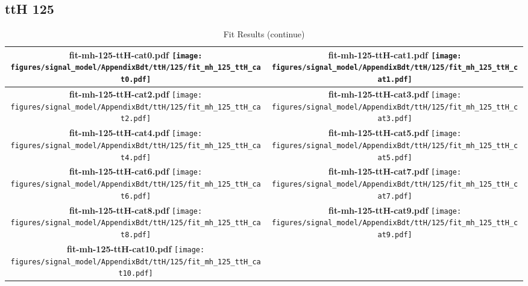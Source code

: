 \subsection{ttH 125}
\begin{longtable}{|c|c|}
\caption{Fit Results}
\endfirsthead
\caption{Fit Results (continue)}
\endhead
\hline
\parbox{0.47\textwidth}{
\centering
{\bfseries fit-mh-125-ttH-cat0.pdf}
\texttt{[image: figures/signal\_model/AppendixBdt/ttH/125/fit\_mh\_125\_ttH\_cat0.pdf]}
}
 & \parbox{0.47\textwidth}{
\centering
{\bfseries fit-mh-125-ttH-cat1.pdf}
\texttt{[image: figures/signal\_model/AppendixBdt/ttH/125/fit\_mh\_125\_ttH\_cat1.pdf]}
}
 \\
\hline
\parbox{0.47\textwidth}{
\centering
{\bfseries fit-mh-125-ttH-cat2.pdf}
\texttt{[image: figures/signal\_model/AppendixBdt/ttH/125/fit\_mh\_125\_ttH\_cat2.pdf]}
}
 & \parbox{0.47\textwidth}{
\centering
{\bfseries fit-mh-125-ttH-cat3.pdf}
\texttt{[image: figures/signal\_model/AppendixBdt/ttH/125/fit\_mh\_125\_ttH\_cat3.pdf]}
}
 \\
\hline
\parbox{0.47\textwidth}{
\centering
{\bfseries fit-mh-125-ttH-cat4.pdf}
\texttt{[image: figures/signal\_model/AppendixBdt/ttH/125/fit\_mh\_125\_ttH\_cat4.pdf]}
}
 & \parbox{0.47\textwidth}{
\centering
{\bfseries fit-mh-125-ttH-cat5.pdf}
\texttt{[image: figures/signal\_model/AppendixBdt/ttH/125/fit\_mh\_125\_ttH\_cat5.pdf]}
}
 \\
\hline
\parbox{0.47\textwidth}{
\centering
{\bfseries fit-mh-125-ttH-cat6.pdf}
\texttt{[image: figures/signal\_model/AppendixBdt/ttH/125/fit\_mh\_125\_ttH\_cat6.pdf]}
}
 & \parbox{0.47\textwidth}{
\centering
{\bfseries fit-mh-125-ttH-cat7.pdf}
\texttt{[image: figures/signal\_model/AppendixBdt/ttH/125/fit\_mh\_125\_ttH\_cat7.pdf]}
}
 \\
\hline
\parbox{0.47\textwidth}{
\centering
{\bfseries fit-mh-125-ttH-cat8.pdf}
\texttt{[image: figures/signal\_model/AppendixBdt/ttH/125/fit\_mh\_125\_ttH\_cat8.pdf]}
}
 & \parbox{0.47\textwidth}{
\centering
{\bfseries fit-mh-125-ttH-cat9.pdf}
\texttt{[image: figures/signal\_model/AppendixBdt/ttH/125/fit\_mh\_125\_ttH\_cat9.pdf]}
}
 \\
\hline
\parbox{0.47\textwidth}{
\centering
{\bfseries fit-mh-125-ttH-cat10.pdf}
\texttt{[image: figures/signal\_model/AppendixBdt/ttH/125/fit\_mh\_125\_ttH\_cat10.pdf]}
}
\end{longtable}

